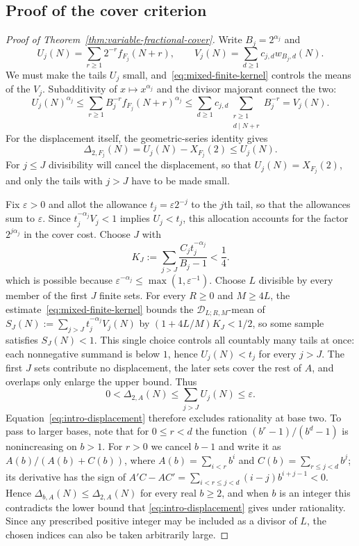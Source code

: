 \documentclass[11pt]{article}
\begin{document}
\subsection{Proof of the cover criterion}
\begin{proof}[Proof of Theorem~\ref{thm:variable-fractional-cover}]
Write $B_j=2^{\alpha_j}$ and
\[
 U_j(N)=\sum_{r\ge1}2^{-r}f_{F_j}(N+r),\qquad
 V_j(N)=\sum_{d\ge1}c_{j,d}w_{B_j,d}(N).
\]
We must make the tails $U_j$ small, and~\eqref{eq:mixed-finite-kernel}
controls the means of the $V_j$. Subadditivity of $x\mapsto x^{\alpha_j}$
and the divisor majorant connect the two:
\[
 U_j(N)^{\alpha_j}
 \le\sum_{r\ge1}B_j^{-r}f_{F_j}(N+r)^{\alpha_j}
 \le\sum_{d\ge1}c_{j,d}
       \sum_{\substack{r\ge1\\d\mid N+r}}B_j^{-r}
 =V_j(N).
\]
For the displacement itself, the geometric-series identity gives
\[
 \Delta_{2,F_j}(N)=U_j(N)-X_{F_j}(2)\le U_j(N).
\]
For $j\le J$ divisibility will cancel the displacement, so that
$U_j(N)=X_{F_j}(2)$, and only the tails with $j>J$ have to be made
small.

Fix $\varepsilon>0$ and allot the allowance $t_j=\varepsilon2^{-j}$ to
the $j$th tail, so that the allowances sum to $\varepsilon$. Since
$t_j^{-\alpha_j}V_j<1$ implies $U_j<t_j$, this allocation accounts for
the factor $2^{j\alpha_j}$ in the cover cost. Choose $J$ with
\[
 K_J:=\sum_{j>J}\frac{C_jt_j^{-\alpha_j}}{B_j-1}<\frac14.
\]
which is possible because $\varepsilon^{-\alpha_j}\le\max(1,\varepsilon^{-1})$.
Choose $L$ divisible by every member of the first $J$ finite sets.
For every $R\ge0$ and $M\ge4L$, the estimate~\eqref{eq:mixed-finite-kernel}
bounds the $\mathscr D_{L;R,M}$-mean of
$S_J(N):=\sum_{j>J}t_j^{-\alpha_j}V_j(N)$ by $(1+4L/M)K_J<1/2$, so
some sample satisfies $S_J(N)<1$. This single choice controls all
countably many tails at once: each nonnegative summand is below $1$,
hence $U_j(N)<t_j$ for every $j>J$. The first $J$ sets contribute no
displacement, the later sets cover the rest of $A$, and overlaps only
enlarge the upper bound. Thus
\[
 0<\Delta_{2,A}(N)\le\sum_{j>J}U_j(N)\le\varepsilon.
\]
Equation~\eqref{eq:intro-displacement} therefore excludes rationality
at base two. To pass to larger bases, note that for $0\le r<d$ the function
$(b^r-1)/(b^d-1)$ is nonincreasing on $b>1$. For $r>0$ we cancel $b-1$
and write it as $A(b)/(A(b)+C(b))$, where $A(b)=\sum_{i<r}b^i$ and
$C(b)=\sum_{r\le j<d}b^j$; its derivative has the sign of
$A'C-AC'=\sum_{i<r\le j<d}(i-j)b^{i+j-1}<0$. Hence
$\Delta_{b,A}(N)\le\Delta_{2,A}(N)$ for every real $b\ge2$, and when
$b$ is an integer this contradicts the lower bound that
\eqref{eq:intro-displacement} gives under rationality. Since any
prescribed positive integer may be included as a divisor of $L$, the
chosen indices can also be taken arbitrarily large.
\end{proof}
\end{document}
